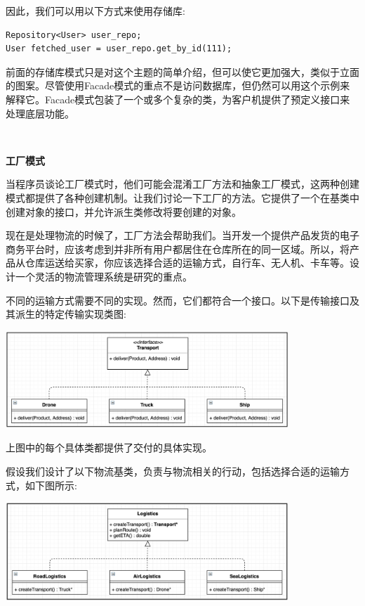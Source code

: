 因此，我们可以用以下方式来使用存储库: \par

\begin{lstlisting}[caption={}]
Repository<User> user_repo;
User fetched_user = user_repo.get_by_id(111);
\end{lstlisting}

前面的存储库模式只是对这个主题的简单介绍，但可以使它更加强大，类似于立面的图案。尽管使用Facade模式的重点不是访问数据库，但仍然可以用这个示例来解释它。Facade模式包装了一个或多个复杂的类，为客户机提供了预定义接口来处理底层功能。 \par

\noindent\textbf{}\ \par
\textbf{工厂模式} \ \par
当程序员谈论工厂模式时，他们可能会混淆工厂方法和抽象工厂模式，这两种创建模式都提供了各种创建机制。让我们讨论一下工厂的方法。它提供了一个在基类中创建对象的接口，并允许派生类修改将要创建的对象。 \par
现在是处理物流的时候了，工厂方法会帮助我们。当开发一个提供产品发货的电子商务平台时，应该考虑到并非所有用户都居住在仓库所在的同一区域。所以，将产品从仓库运送给买家，你应该选择合适的运输方式，自行车、无人机、卡车等。设计一个灵活的物流管理系统是研究的重点。 \par
不同的运输方式需要不同的实现。然而，它们都符合一个接口。以下是传输接口及其派生的特定传输实现类图: \par

\begin{center}
	\includegraphics[width=0.8\textwidth]{content/Section-2/Chapter-10/11}
\end{center}

上图中的每个具体类都提供了交付的具体实现。 \par
假设我们设计了以下物流基类，负责与物流相关的行动，包括选择合适的运输方式，如下图所示: \par

\begin{center}
	\includegraphics[width=0.8\textwidth]{content/Section-2/Chapter-10/12}
\end{center}

